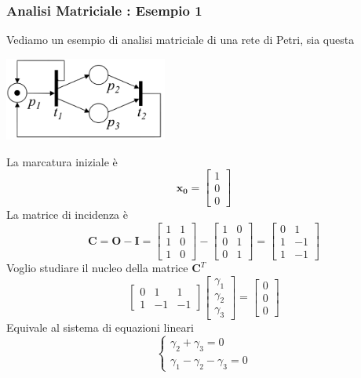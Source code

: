 \documentclass[10pt, letterpaper]{report}
\begin{document}
\subsubsection{Analisi Matriciale : Esempio 1} 
Vediamo un esempio di analisi matriciale di una rete di Petri, sia questa
\begin{center}
    \includegraphics[width=0.4\textwidth]{images/petriMatrix.pdf}
\end{center}
La marcatura iniziale è $$\mathbf{x_0}=\begin{bmatrix}
    1\\ 0\\ 0
\end{bmatrix}$$ 
La matrice di incidenza è 
$$ \mathbf C = \mathbf O - \mathbf I =\begin{bmatrix}
    1 & 1 \\ 
    1 & 0 \\ 
    1 & 0
\end{bmatrix}-\begin{bmatrix}
    1 & 0 \\ 
    0 & 1 \\ 
    0 & 1
\end{bmatrix}=\begin{bmatrix}
    0 & 1 \\ 
    1 & -1 \\ 
    1 & -1
\end{bmatrix}
$$
Voglio studiare il nucleo della matrice $\mathbf C^T$
$$ \begin{bmatrix}
    0 & 1 & 1\\ 
    1 & -1 & -1
\end{bmatrix}\begin{bmatrix}
    \gamma_1 \\ \gamma_2 \\ \gamma_3
\end{bmatrix}=\begin{bmatrix}
    0 \\ 0 \\ 0
\end{bmatrix}$$
Equivale al sistema di equazioni lineari 
$$ 
\begin{cases}
    \gamma_2+\gamma_3=0\\ 
    \gamma_1-\gamma_2-\gamma_3=0
\end{cases}
$$
\end{document}
